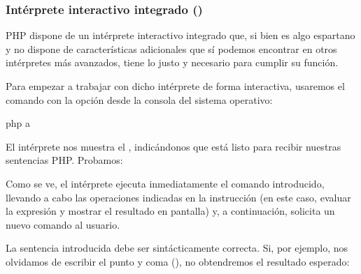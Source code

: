 \documentclass[a4paper,12pt,spanish]{sphinxmanual}
\begin{document}
\subsubsection{Intérprete interactivo integrado ()}
\label{\detokenize{php:interprete-interactivo-integrado-php-a}}
PHP dispone de un intérprete interactivo integrado que, si bien es algo
espartano y no dispone de características adicionales que sí podemos encontrar
en otros intérpretes más avanzados, tiene lo justo y necesario para cumplir su
función.

Para empezar a trabajar con dicho intérprete de forma interactiva, usaremos el
comando  con la opción  desde la consola del sistema operativo:

%
\begin{sphinxVerbatim}[commandchars=\\\{\}]
 php \PYGZhy{}a

\end{sphinxVerbatim}

El intérprete nos muestra el  , indicándonos que está listo
para recibir nuestras sentencias PHP. Probamos:

%
\begin{sphinxVerbatim}[commandchars=\\\{\}]
\end{sphinxVerbatim}

Como se ve, el intérprete ejecuta inmediatamente el comando introducido,
llevando a cabo las operaciones indicadas en la instrucción (en este caso,
evaluar la expresión y mostrar el resultado en pantalla) y, a continuación,
solicita un nuevo comando al usuario.

La sentencia introducida debe ser sintácticamente correcta. Si, por ejemplo, nos
olvidamos de escribir el punto y coma (\sphinxcode{\sphinxupquote{;}}), no obtendremos el resultado
esperado:

%
\begin{sphinxVerbatim}[commandchars=\\\{\}]


\end{sphinxVerbatim}
\end{document}
